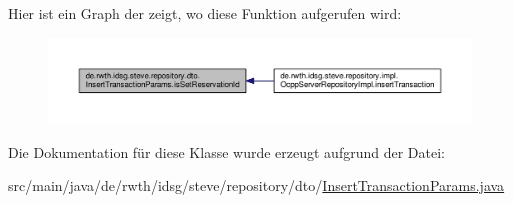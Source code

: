 Hier ist ein Graph der zeigt, wo diese Funktion aufgerufen wird\-:\nopagebreak
\begin{figure}[H]
\begin{center}
\leavevmode
\includegraphics[width=350pt]{classde_1_1rwth_1_1idsg_1_1steve_1_1repository_1_1dto_1_1_insert_transaction_params_ae07ba84ac72f8fca7764d902dd198de5_icgraph}
\end{center}
\end{figure}




Die Dokumentation für diese Klasse wurde erzeugt aufgrund der Datei\-:\begin{DoxyCompactItemize}
\item 
src/main/java/de/rwth/idsg/steve/repository/dto/\hyperlink{_insert_transaction_params_8java}{Insert\-Transaction\-Params.\-java}\end{DoxyCompactItemize}
